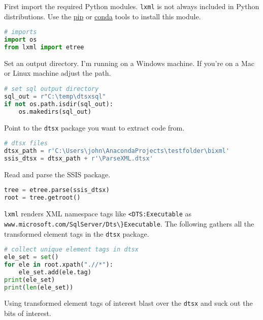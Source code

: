 First import the required Python modules. \texttt{lxml} is not always
included in Python distributions. Use the
\href{https://remotedevdaily.com/how-to-install-lxml-in-python-using-pip/}{pip}
or \href{https://anaconda.org/anaconda/lxml}{conda} tools to install
this module.

\begin{lstlisting}[language=python, frame=single, framerule=0pt, label=lst:scr5673X0]
# imports
import os
from lxml import etree
\end{lstlisting}

Set an output directory. I'm running on a Windows machine. If you're on
a Mac or Linux machine adjust the path.

\begin{lstlisting}[language=python, frame=single, framerule=0pt, label=lst:scr5673X1]
# set sql output directory
sql_out = r"C:\temp\dtsxsql"
if not os.path.isdir(sql_out):
    os.makedirs(sql_out)
\end{lstlisting}


Point to the \texttt{dtsx} package you want to extract code from.


\begin{lstlisting}[language=python, frame=single, framerule=0pt, label=lst:scr5673X2]
# dtsx files
dtsx_path = r'C:\Users\john\AnacondaProjects\testfolder\bixml'
ssis_dtsx = dtsx_path + r'\ParseXML.dtsx'
\end{lstlisting}


Read and parse the SSIS package.

\begin{lstlisting}[language=python, frame=single, framerule=0pt, label=lst:scr5673X3]
tree = etree.parse(ssis_dtsx)
root = tree.getroot()
\end{lstlisting}


\texttt{lxml} renders XML namespace tags like
\verb|<DTS:Executable| as
\verb|www.microsoft.com/SqlServer/Dts\}Executable|. The following
gathers all the transformed element tags in the \texttt{dtsx} package.


\begin{lstlisting}[language=python, frame=single, framerule=0pt, label=lst:scr5673X4]
# collect unique element tags in dtsx
ele_set = set()
for ele in root.xpath(".//*"):
    ele_set.add(ele.tag)    
print(ele_set)
print(len(ele_set))
\end{lstlisting}

Using transformed element tags of interest blast over the \texttt{dtsx}
and suck out the bits of interest.

